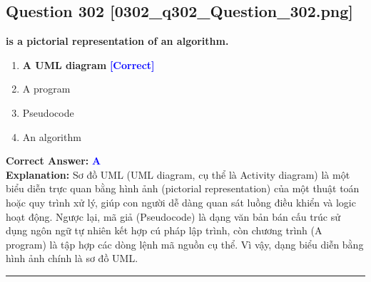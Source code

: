 \documentclass[11pt,a4paper]{article}
\begin{document}
\begin{minipage}{\textwidth}
\subsection*{Question 302 \quad \footnotesize{[0302\_q302\_Question\_302.png]}}
\noindent \textbf{is a pictorial representation of an algorithm.}

\begin{enumerate}[label=\Alph*.]
    \item \textbf{A UML diagram} \hfill \textcolor{blue}{\textbf{[Correct]}}
    \item A program
    \item Pseudocode
    \item An algorithm
\end{enumerate}

\noindent \textbf{Correct Answer:} \textcolor{blue}{\textbf{A}} \\[2pt]
\noindent \textbf{Explanation:} Sơ đồ UML (UML diagram, cụ thể là Activity diagram) là một biểu diễn trực quan bằng hình ảnh (pictorial representation) của một thuật toán hoặc quy trình xử lý, giúp con người dễ dàng quan sát luồng điều khiển và logic hoạt động. Ngược lại, mã giả (Pseudocode) là dạng văn bản bán cấu trúc sử dụng ngôn ngữ tự nhiên kết hợp cú pháp lập trình, còn chương trình (A program) là tập hợp các dòng lệnh mã nguồn cụ thể. Vì vậy, dạng biểu diễn bằng hình ảnh chính là sơ đồ UML.

\par\vspace{0.3cm}
\hrule
\vspace{0.3cm}
\end{minipage}
\end{document}
